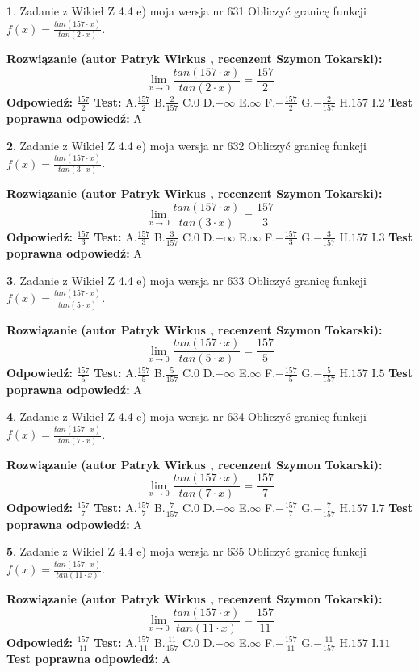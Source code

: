 \documentclass[12pt, a4paper]{article}
\theoremstyle{definition} %
\newtheorem{zad}{}
\newcommand{\zadStart}[1]{\begin{zad}#1\newline}
\newcommand{\zadStop}{\end{zad}}
\newcommand{\rozwStart}[2]{\noindent \textbf{Rozwiązanie (autor #1 , recenzent #2): }\newline}
\newcommand{\rozwStop}{\newline}
\newcommand{\odpStart}{\noindent \textbf{Odpowiedź:}\newline}
\newcommand{\odpStop}{\newline}
\newcommand{\testStart}{\noindent \textbf{Test:}\newline}
\newcommand{\testStop}{\newline}
\newcommand{\kluczStart}{\noindent \textbf{Test poprawna odpowiedź:}\newline}
\newcommand{\kluczStop}{\newline}
\begin{document}
\zadStart{Zadanie z Wikieł Z 4.4 e) moja wersja nr 631}
Obliczyć granicę funkcji $f(x)=\frac{tan(157\cdot x)}{tan(2\cdot x)}$.
\zadStop
\rozwStart{Patryk Wirkus}{Szymon Tokarski}
$$\lim\limits_{x\to 0}\frac{tan(157\cdot x)}{tan(2\cdot x)}=
\frac{157}{2}$$
\rozwStop
\odpStart
$\frac{157}{2}$
\odpStop
\testStart
A.$\frac{157}{2}$
B.$\frac{2}{157}$
C.$0$
D.$-\infty$
E.$\infty$
F.$-\frac{157}{2}$
G.$-\frac{2}{157}$
H.$157$
I.$2$
\testStop
\kluczStart
A
\kluczStop



\zadStart{Zadanie z Wikieł Z 4.4 e) moja wersja nr 632}
Obliczyć granicę funkcji $f(x)=\frac{tan(157\cdot x)}{tan(3\cdot x)}$.
\zadStop
\rozwStart{Patryk Wirkus}{Szymon Tokarski}
$$\lim\limits_{x\to 0}\frac{tan(157\cdot x)}{tan(3\cdot x)}=
\frac{157}{3}$$
\rozwStop
\odpStart
$\frac{157}{3}$
\odpStop
\testStart
A.$\frac{157}{3}$
B.$\frac{3}{157}$
C.$0$
D.$-\infty$
E.$\infty$
F.$-\frac{157}{3}$
G.$-\frac{3}{157}$
H.$157$
I.$3$
\testStop
\kluczStart
A
\kluczStop



\zadStart{Zadanie z Wikieł Z 4.4 e) moja wersja nr 633}
Obliczyć granicę funkcji $f(x)=\frac{tan(157\cdot x)}{tan(5\cdot x)}$.
\zadStop
\rozwStart{Patryk Wirkus}{Szymon Tokarski}
$$\lim\limits_{x\to 0}\frac{tan(157\cdot x)}{tan(5\cdot x)}=
\frac{157}{5}$$
\rozwStop
\odpStart
$\frac{157}{5}$
\odpStop
\testStart
A.$\frac{157}{5}$
B.$\frac{5}{157}$
C.$0$
D.$-\infty$
E.$\infty$
F.$-\frac{157}{5}$
G.$-\frac{5}{157}$
H.$157$
I.$5$
\testStop
\kluczStart
A
\kluczStop



\zadStart{Zadanie z Wikieł Z 4.4 e) moja wersja nr 634}
Obliczyć granicę funkcji $f(x)=\frac{tan(157\cdot x)}{tan(7\cdot x)}$.
\zadStop
\rozwStart{Patryk Wirkus}{Szymon Tokarski}
$$\lim\limits_{x\to 0}\frac{tan(157\cdot x)}{tan(7\cdot x)}=
\frac{157}{7}$$
\rozwStop
\odpStart
$\frac{157}{7}$
\odpStop
\testStart
A.$\frac{157}{7}$
B.$\frac{7}{157}$
C.$0$
D.$-\infty$
E.$\infty$
F.$-\frac{157}{7}$
G.$-\frac{7}{157}$
H.$157$
I.$7$
\testStop
\kluczStart
A
\kluczStop



\zadStart{Zadanie z Wikieł Z 4.4 e) moja wersja nr 635}
Obliczyć granicę funkcji $f(x)=\frac{tan(157\cdot x)}{tan(11\cdot x)}$.
\zadStop
\rozwStart{Patryk Wirkus}{Szymon Tokarski}
$$\lim\limits_{x\to 0}\frac{tan(157\cdot x)}{tan(11\cdot x)}=
\frac{157}{11}$$
\rozwStop
\odpStart
$\frac{157}{11}$
\odpStop
\testStart
A.$\frac{157}{11}$
B.$\frac{11}{157}$
C.$0$
D.$-\infty$
E.$\infty$
F.$-\frac{157}{11}$
G.$-\frac{11}{157}$
H.$157$
I.$11$
\testStop
\kluczStart
A
\kluczStop
\end{document}
